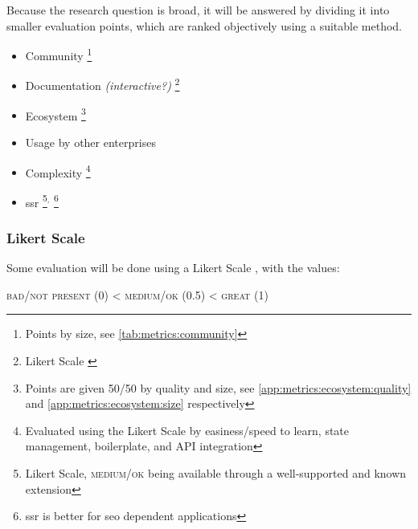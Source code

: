 Because the research question is broad, it will be answered by dividing it into smaller evaluation points, which are ranked objectively using a suitable method.

\begin{itemize}
    \item Community \footnote{Points by size, see \ref{tab:metrics:community}}
    \item Documentation \textit{(interactive?)} \footnote{Likert Scale \label{fn:likert_scale}}
    \item Ecosystem \footnote{Points are given 50/50 by quality and size, see \ref{app:metrics:ecosystem:quality} and \ref{app:metrics:ecosystem:size} respectively}
    \item Usage by other enterprises 
    \item Complexity \footnote{Evaluated using the Likert Scale by easiness/speed to learn, state management, boilerplate, and API integration}
    \item \acrfull{ssr} \footnote{Likert Scale, \textsc{medium/ok} being available through a well-supported and known extension}$^,$ \footnote{\acrshort{ssr} is better for \acrshort{seo} dependent applications}
\end{itemize}

\subsubsection{Likert Scale}

Some evaluation will be done using a Likert Scale \cite{enwiki:likert_scale}, with the values:

\begin{center}
    \textsc{bad/not present (0)} < \textsc{medium/ok (0.5)} < \textsc{great (1)}
\end{center}
